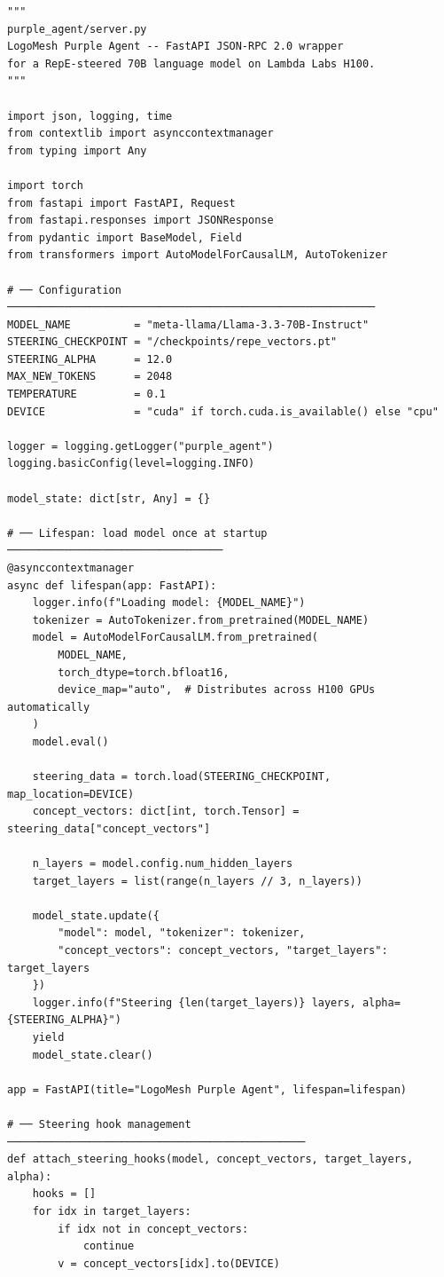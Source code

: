\documentclass[11pt, a4paper]{article}
\begin{document}
\begin{codebox}
\begin{lstlisting}[style=python]
"""
purple_agent/server.py
LogoMesh Purple Agent -- FastAPI JSON-RPC 2.0 wrapper
for a RepE-steered 70B language model on Lambda Labs H100.
"""

import json, logging, time
from contextlib import asynccontextmanager
from typing import Any

import torch
from fastapi import FastAPI, Request
from fastapi.responses import JSONResponse
from pydantic import BaseModel, Field
from transformers import AutoModelForCausalLM, AutoTokenizer

# ── Configuration ──────────────────────────────────────────────────────────
MODEL_NAME          = "meta-llama/Llama-3.3-70B-Instruct"
STEERING_CHECKPOINT = "/checkpoints/repe_vectors.pt"
STEERING_ALPHA      = 12.0
MAX_NEW_TOKENS      = 2048
TEMPERATURE         = 0.1
DEVICE              = "cuda" if torch.cuda.is_available() else "cpu"

logger = logging.getLogger("purple_agent")
logging.basicConfig(level=logging.INFO)

model_state: dict[str, Any] = {}

# ── Lifespan: load model once at startup ──────────────────────────────────
@asynccontextmanager
async def lifespan(app: FastAPI):
    logger.info(f"Loading model: {MODEL_NAME}")
    tokenizer = AutoTokenizer.from_pretrained(MODEL_NAME)
    model = AutoModelForCausalLM.from_pretrained(
        MODEL_NAME,
        torch_dtype=torch.bfloat16,
        device_map="auto",  # Distributes across H100 GPUs automatically
    )
    model.eval()

    steering_data = torch.load(STEERING_CHECKPOINT, map_location=DEVICE)
    concept_vectors: dict[int, torch.Tensor] = steering_data["concept_vectors"]

    n_layers = model.config.num_hidden_layers
    target_layers = list(range(n_layers // 3, n_layers))

    model_state.update({
        "model": model, "tokenizer": tokenizer,
        "concept_vectors": concept_vectors, "target_layers": target_layers
    })
    logger.info(f"Steering {len(target_layers)} layers, alpha={STEERING_ALPHA}")
    yield
    model_state.clear()

app = FastAPI(title="LogoMesh Purple Agent", lifespan=lifespan)

# ── Steering hook management ───────────────────────────────────────────────
def attach_steering_hooks(model, concept_vectors, target_layers, alpha):
    hooks = []
    for idx in target_layers:
        if idx not in concept_vectors:
            continue
        v = concept_vectors[idx].to(DEVICE)


\end{lstlisting}
\end{codebox}
\end{document}
